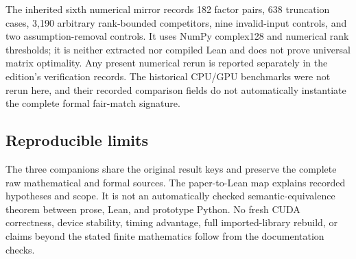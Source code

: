 The inherited sixth numerical mirror records 182 factor pairs, 638 truncation cases, 3,190 arbitrary rank-bounded competitors, nine invalid-input controls, and two assumption-removal controls. It uses NumPy complex128 and numerical rank thresholds; it is neither extracted nor compiled Lean and does not prove universal matrix optimality. Any present numerical rerun is reported separately in the edition's verification records. The historical CPU/GPU benchmarks were not rerun here, and their recorded comparison fields do not automatically instantiate the complete formal fair-match signature.

\subsection{Reproducible limits}
The three companions share the original result keys and preserve the complete raw mathematical and formal sources. The paper-to-Lean map explains recorded hypotheses and scope. It is not an automatically checked semantic-equivalence theorem between prose, Lean, and prototype Python. No fresh CUDA correctness, device stability, timing advantage, full imported-library rebuild, or claims beyond the stated finite mathematics follow from the documentation checks.
